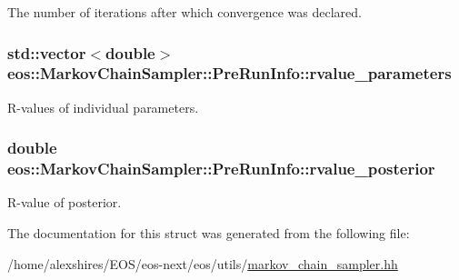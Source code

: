 The number of iterations after which convergence was declared. \hypertarget{structeos_1_1MarkovChainSampler_1_1PreRunInfo_a568ebe4315e338e9e6ea690c268a964b}{
\subsubsection[{rvalue\_\-parameters}]{\setlength{\rightskip}{0pt plus 5cm}std::vector$<$double$>$ {\bf eos::MarkovChainSampler::PreRunInfo::rvalue\_\-parameters}}}
\label{structeos_1_1MarkovChainSampler_1_1PreRunInfo_a568ebe4315e338e9e6ea690c268a964b}


R-\/values of individual parameters. \hypertarget{structeos_1_1MarkovChainSampler_1_1PreRunInfo_a7bf1e8c85dc0ae0e72e64737a033c8c2}{
\subsubsection[{rvalue\_\-posterior}]{\setlength{\rightskip}{0pt plus 5cm}double {\bf eos::MarkovChainSampler::PreRunInfo::rvalue\_\-posterior}}}
\label{structeos_1_1MarkovChainSampler_1_1PreRunInfo_a7bf1e8c85dc0ae0e72e64737a033c8c2}


R-\/value of posterior. 

The documentation for this struct was generated from the following file:\begin{DoxyCompactItemize}
\item 
/home/alexshires/EOS/eos-\/next/eos/utils/\hyperlink{markov__chain__sampler_8hh}{markov\_\-chain\_\-sampler.hh}\end{DoxyCompactItemize}
